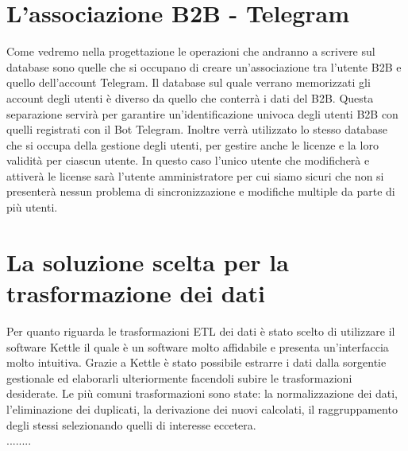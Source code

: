 \section{L'associazione B2B - Telegram}
Come vedremo nella progettazione le operazioni che andranno a scrivere sul database sono quelle che si occupano di creare un'associazione tra l'utente B2B e quello dell'account Telegram. Il database sul quale verrano memorizzati gli account degli utenti è diverso da quello che conterrà i dati del B2B. Questa separazione servirà per garantire un'identificazione univoca degli utenti B2B con quelli registrati con il Bot Telegram. Inoltre verrà utilizzato lo stesso database che si occupa della gestione degli utenti, per gestire anche le licenze e la loro validità per ciascun utente. In questo caso l'unico utente che modificherà e attiverà le license sarà l'utente amministratore per cui siamo sicuri che non si presenterà nessun problema di sincronizzazione e modifiche multiple da parte di più utenti. 

\section{La  soluzione scelta per la trasformazione dei dati}

Per quanto riguarda le trasformazioni ETL dei dati è stato scelto di utilizzare il software Kettle il quale è un software molto affidabile e presenta un'interfaccia molto intuitiva. Grazie a Kettle è stato possibile estrarre i dati dalla sorgentie gestionale ed elaborarli ulteriormente facendoli subire le trasformazioni desiderate. Le più comuni trasformazioni sono state: la normalizzazione dei dati, l'eliminazione dei duplicati, la derivazione dei nuovi calcolati, il raggruppamento degli stessi selezionando quelli di interesse eccetera. \\

........


